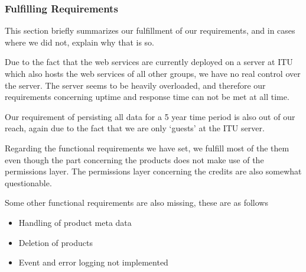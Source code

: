 \subsubsection{Fulfilling Requirements}
\label{serverfulfil}
This section briefly summarizes our fulfillment of our requirements, and in cases where we did not, explain why that is so.

Due to the fact that the web services are currently deployed on a server at ITU which also hosts the web services of all other groups, we have no real control over the server. The server seems to be heavily overloaded, and therefore our requirements concerning uptime and response time can not be met at all time.

Our requirement of persisting all data for a 5 year time period is also out of our reach, again due to the fact that we are only `guests' at the ITU server.

Regarding the functional requirements we have set, we fulfill most of the them even though the part concerning the products does not make use of the permissions layer. The permissions layer concerning the credits are also somewhat questionable.

Some other functional requirements are also missing, these are as follows
\begin{itemize}
\item Handling of product meta data
\item Deletion of products
\item Event and error logging not implemented
\end{itemize}
